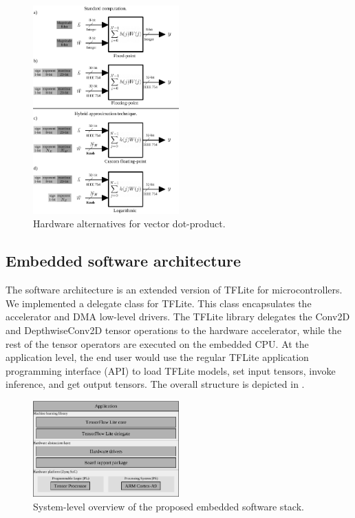 \begin{figure}[t!]
	\centering
	\includegraphics[width=0.5\textwidth]{../figures/dot-product_unit.pdf}
	\caption{Hardware alternatives for vector dot-product.}
	\label{fig:dot_product}
\end{figure}


\subsection{Embedded software architecture}
The software architecture is an extended version of TFLite for microcontrollers\cite{TensorFlowLibrary}. We implemented a delegate class for TFLite. This class encapsulates the accelerator and DMA low-level drivers. The TFLite library delegates the  Conv2D and DepthwiseConv2D tensor operations to the hardware accelerator, while the rest of the tensor operators are executed on the embedded CPU. At the application level, the end user would use the regular TFLite application programming interface (API) to load TFLite models, set input tensors, invoke inference, and get output tensors. The overall structure is depicted in .

\begin{figure}[t!]
	\centering
	\includegraphics[width=0.5\textwidth]{../figures/sw_stack.pdf}
	\caption{System-level overview of the proposed embedded software stack.}
	\label{fig:sw_stack}
\end{figure}
